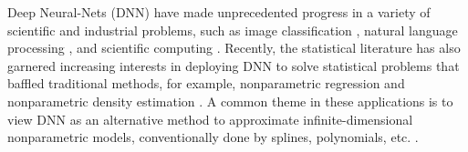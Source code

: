\documentclass{article}
\theoremstyle{plain}
\theoremstyle{definition}
\theoremstyle{remark}
\begin{document}

Deep Neural-Nets (DNN) have made unprecedented progress in a variety of scientific and industrial problems, such as image classification \citep{krizhevsky2012imagenet}, natural language processing \citep{vaswani2017attention}, and scientific computing \citep{e2018deep}. Recently, the statistical literature has also garnered increasing interests in deploying DNN to solve statistical problems that baffled traditional methods, for example, nonparametric regression \citep{chen1999improved, suzuki2019adaptivity, schmidt2020nonparametric, padilla2022quantile} and nonparametric density estimation \citep{liu2021density, liang2021well}. A common theme in these applications is to view DNN as an alternative method to approximate infinite-dimensional nonparametric models, conventionally done by splines, polynomials, etc. \citep{gine2016mathematical}.
 
\end{document}
